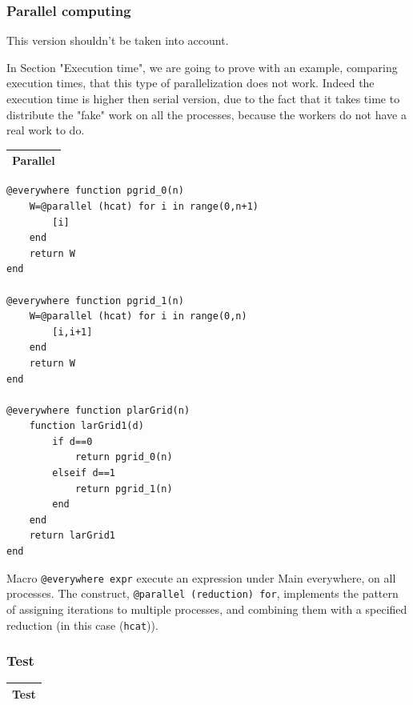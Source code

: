 \documentclass{article}
\begin{document}
\subsubsection{Parallel computing}
\vspace{1ex}
This version shouldn't be taken into account.

In Section "Execution time", we are going to prove with an example, comparing execution times, that this type of parallelization does not work. Indeed the execution time is higher then serial version, due to the fact that it takes time to distribute the "fake" work on all the processes, because the workers do not have a real work to do.
\begin{flushleft} \small
\begin{center}
\begin{tabular}{|p{16cm}|}
\hline
\cellcolor[gray]{.9}Parallel\\
\hline
\end{tabular}
\end{center}
\vspace{2ex}
\begin{list}{}{} \item
\begin{Verbatim}[tabsize=4]
@everywhere function pgrid_0(n)
	W=@parallel (hcat) for i in range(0,n+1) 
		[i] 
	end
	return W
end

@everywhere function pgrid_1(n)
	W=@parallel (hcat) for i in range(0,n) 
		[i,i+1] 
	end
	return W
end

@everywhere function plarGrid(n)
    function larGrid1(d)
        if d==0 
            return pgrid_0(n)
        elseif d==1 
            return pgrid_1(n) 
        end
    end
    return larGrid1
end
\end{Verbatim}
\end{list}
\vspace{2ex}
\footnotesize\addtolength{\baselineskip}{-1ex}
\end{flushleft}
Macro \texttt{@everywhere expr} execute an expression under Main everywhere, on all processes. The construct, \texttt{@parallel (reduction) for}, implements the pattern of assigning iterations to multiple processes, and combining them with a specified reduction (in this case (\texttt{hcat})). 
\vspace{2ex}

\subsubsection{Test}
\begin{center}
\begin{tabular}{|p{16cm}|}
\hline
\cellcolor[gray]{.9}Test\\
\hline
\end{tabular}
\end{center}
\end{document}
